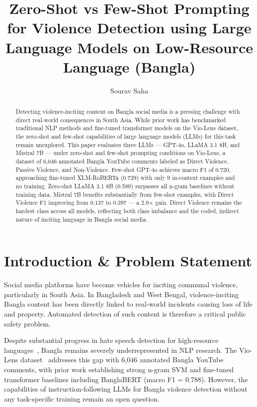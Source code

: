 \documentclass[sigconf,nonacm]{acmart}
\title{Zero-Shot vs Few-Shot Prompting for Violence Detection using Large Language Models on Low-Resource Language (Bangla)}
\author{Sourav Saha}
\affiliation{%
  \institution{University of Central Florida}
  \city{Orlando, Florida, USA}
}
\begin{document}
\begin{abstract}
Detecting violence-inciting content on Bangla social media is a pressing challenge with direct real-world consequences in South Asia. While prior work has benchmarked traditional NLP methods and fine-tuned transformer models on the Vio-Lens dataset, the zero-shot and few-shot capabilities of large language models (LLMs) for this task remain unexplored. This paper evaluates three LLMs — GPT-4o, LLaMA 3.1 8B, and Mistral 7B — under zero-shot and few-shot prompting conditions on Vio-Lens, a dataset of 6,046 annotated Bangla YouTube comments labeled as Direct Violence, Passive Violence, and Non-Violence. Few-shot GPT-4o achieves macro F1 of 0.720, approaching fine-tuned XLM-RoBERTa (0.729) with only 9 in-context examples and no training. Zero-shot LLaMA 3.1 8B (0.589) surpasses all n-gram baselines without training data. Mistral 7B benefits substantially from few-shot examples, with Direct Violence F1 improving from 0.137 to 0.397 — a 2.9$\times$ gain. Direct Violence remains the hardest class across all models, reflecting both class imbalance and the coded, indirect nature of inciting language in Bangla social media.
\end{abstract}

\maketitle

\section{Introduction \& Problem Statement}

Social media platforms have become vehicles for inciting communal violence, particularly in South Asia. In Bangladesh and West Bengal, violence-inciting Bangla content has been directly linked to real-world incidents causing loss of life and property. Automated detection of such content is therefore a critical public safety problem.

Despite substantial progress in hate speech detection for high-resource languages~\cite{nobata2016,bdshs}, Bangla remains severely underrepresented in NLP research. The Vio-Lens dataset~\cite{violens} addresses this gap with 6,046 annotated Bangla YouTube comments, with prior work establishing strong n-gram SVM and fine-tuned transformer baselines including BanglaBERT (macro F1 = 0.788). However, the capabilities of instruction-following LLMs for Bangla violence detection without any task-specific training remain an open question.
\end{document}
